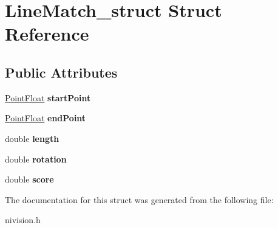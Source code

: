 \hypertarget{structLineMatch__struct}{\section{\-Line\-Match\-\_\-struct \-Struct \-Reference}
\label{structLineMatch__struct}
}
\subsection*{\-Public \-Attributes}
\begin{DoxyCompactItemize}
\item 
\hypertarget{structLineMatch__struct_af1d5f245be68486c0a2bc25c46dc5e8d}{\hyperlink{structPointFloat__struct}{\-Point\-Float} {\bfseries start\-Point}}\label{structLineMatch__struct_af1d5f245be68486c0a2bc25c46dc5e8d}

\item 
\hypertarget{structLineMatch__struct_a95a758195d2469f131ad0d7dea84bff1}{\hyperlink{structPointFloat__struct}{\-Point\-Float} {\bfseries end\-Point}}\label{structLineMatch__struct_a95a758195d2469f131ad0d7dea84bff1}

\item 
\hypertarget{structLineMatch__struct_a7a2c480ebab2948411880b3bfd6f82fe}{double {\bfseries length}}\label{structLineMatch__struct_a7a2c480ebab2948411880b3bfd6f82fe}

\item 
\hypertarget{structLineMatch__struct_a926da5ef2198fb7e9ff198622872fc02}{double {\bfseries rotation}}\label{structLineMatch__struct_a926da5ef2198fb7e9ff198622872fc02}

\item 
\hypertarget{structLineMatch__struct_af67d0d397b2e34b13d9121b6741fd998}{double {\bfseries score}}\label{structLineMatch__struct_af67d0d397b2e34b13d9121b6741fd998}

\end{DoxyCompactItemize}


\-The documentation for this struct was generated from the following file\-:\begin{DoxyCompactItemize}
\item 
nivision.\-h\end{DoxyCompactItemize}
